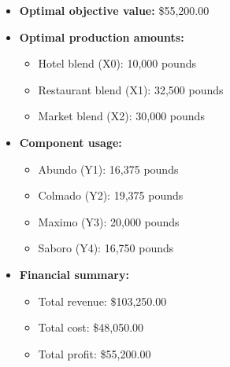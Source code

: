 \documentclass[11pt]{article}
\begin{document}
\begin{enumerate}
\begin{itemize}
\item \textbf{Optimal objective value:} \$55,200.00
\item \textbf{Optimal production amounts:}
  \begin{itemize}
  \item Hotel blend (X0): 10,000 pounds
  \item Restaurant blend (X1): 32,500 pounds  
  \item Market blend (X2): 30,000 pounds
  \end{itemize}
\item \textbf{Component usage:}
  \begin{itemize}
  \item Abundo (Y1): 16,375 pounds
  \item Colmado (Y2): 19,375 pounds
  \item Maximo (Y3): 20,000 pounds
  \item Saboro (Y4): 16,750 pounds
  \end{itemize}
\item \textbf{Financial summary:}
  \begin{itemize}
  \item Total revenue: \$103,250.00
  \item Total cost: \$48,050.00
  \item Total profit: \$55,200.00
  \end{itemize}
\end{itemize}



\end{enumerate}
\end{document}
